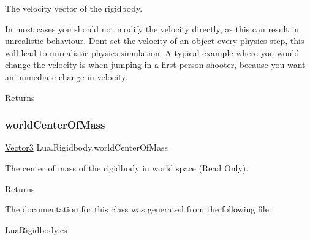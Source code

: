 The velocity vector of the rigidbody. 

In most cases you should not modify the velocity directly, as this can result in unrealistic behaviour. Don\textquotesingle{}t set the velocity of an object every physics step, this will lead to unrealistic physics simulation. A typical example where you would change the velocity is when jumping in a first person shooter, because you want an immediate change in velocity. \begin{DoxyReturn}{Returns}

\end{DoxyReturn}
\mbox{\label{class_lua_1_1_rigidbody_a23530e52ed361ac1f758e8204a1c833b}} 
\subsubsection{\texorpdfstring{worldCenterOfMass}{worldCenterOfMass}}
{\footnotesize\ttfamily \mbox{\hyperlink{class_lua_1_1_vector3}{Vector3}} Lua.\+Rigidbody.\+world\+Center\+Of\+Mass\hspace{0.3cm}{\ttfamily [get]}}



The center of mass of the rigidbody in world space (Read Only). 

\begin{DoxyReturn}{Returns}

\end{DoxyReturn}


The documentation for this class was generated from the following file\+:\begin{DoxyCompactItemize}
\item 
Lua\+Rigidbody.\+cs\end{DoxyCompactItemize}

